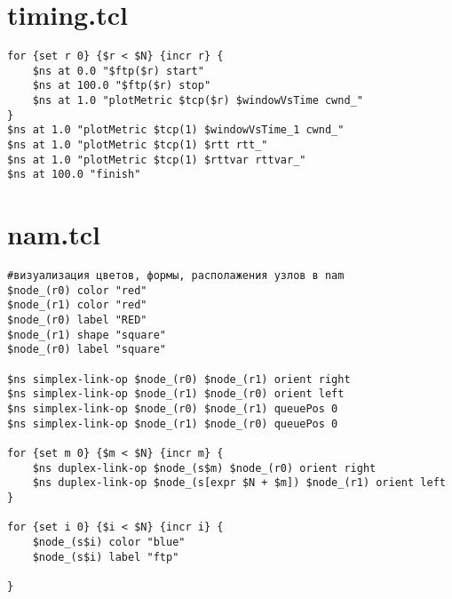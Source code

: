 \section*{timing.tcl}
\label{app1:sec5}
\begin{verbatim}
for {set r 0} {$r < $N} {incr r} {
	$ns at 0.0 "$ftp($r) start"
	$ns at 100.0 "$ftp($r) stop"
	$ns at 1.0 "plotMetric $tcp($r) $windowVsTime cwnd_"
}
$ns at 1.0 "plotMetric $tcp(1) $windowVsTime_1 cwnd_"
$ns at 1.0 "plotMetric $tcp(1) $rtt rtt_"
$ns at 1.0 "plotMetric $tcp(1) $rttvar rttvar_"
$ns at 100.0 "finish"
\end{verbatim}

\section*{nam.tcl}
\label{app1:sec6}
\begin{verbatim}
#визуализация цветов, формы, располажения узлов в nam
$node_(r0) color "red"
$node_(r1) color "red"
$node_(r0) label "RED"
$node_(r1) shape "square"
$node_(r0) label "square"

$ns simplex-link-op $node_(r0) $node_(r1) orient right
$ns simplex-link-op $node_(r1) $node_(r0) orient left
$ns simplex-link-op $node_(r0) $node_(r1) queuePos 0
$ns simplex-link-op $node_(r1) $node_(r0) queuePos 0

for {set m 0} {$m < $N} {incr m} {
	$ns duplex-link-op $node_(s$m) $node_(r0) orient right
	$ns duplex-link-op $node_(s[expr $N + $m]) $node_(r1) orient left 
}

for {set i 0} {$i < $N} {incr i} {
	$node_(s$i) color "blue"
	$node_(s$i) label "ftp"

}
\end{verbatim}

